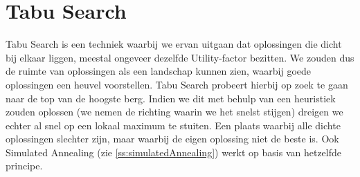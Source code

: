 \section{Tabu Search}
\label{ss:tabuSearch}
Tabu Search is een techniek waarbij we ervan uitgaan dat oplossingen die dicht bij elkaar liggen, meestal ongeveer dezelfde Utility-factor bezitten. We zouden dus de ruimte van oplossingen als een landschap kunnen zien, waarbij goede oplossingen een heuvel voorstellen. Tabu Search probeert hierbij op zoek te gaan naar de top van de hoogste berg. Indien we dit met behulp van een heuristiek zouden oplossen (we nemen de richting waarin we het snelst stijgen) dreigen we echter al snel op een lokaal maximum te stuiten. Een plaats waarbij alle dichte oplossingen slechter zijn, maar waarbij de eigen oplossing niet de beste is. Ook Simulated Annealing (zie \ref{ss:simulatedAnnealing}) werkt op basis van hetzelfde principe.
